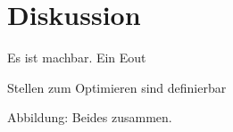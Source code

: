 \chapter{Diskussion}


Es ist machbar.
Ein   Eout

Stellen zum Optimieren sind definierbar

Abbildung: Beides zusammen. 

